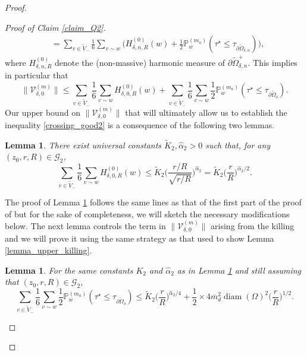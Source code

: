 \documentclass{article}
\newcommand{\PP}{{\mathbb{P}}}
\newtheorem{lemma}[theorem]{Lemma}
\theoremstyle{definition}
\theoremstyle{remark}
\theoremstyle{remark}
\begin{document}
\begin{proof}
\begin{proof}[Proof of Claim \ref{claim_Q2}]
\begin{align*}
    &= \sum_{v \in \tilde V_{-}} \frac{1}{6} \sum_{v \sim w} \bigg( H_{\delta, n, R}^{(0)}(w) +\frac{1}{2}\PP_{w}^{({m}_a)}(\tau^{\star} \leq \tau_{\partial \tilde \Omega_{\delta,n}}) \bigg), 
\end{align*}
where $H_{\delta, n, R}^{(0)}$ denote the (non-massive) harmonic measure of $\partial \tilde \Omega_{\delta, n}^{+}$. This implies in particular that
\begin{equation} \label{ineq_V0}
    \| \mathcal{V}_{\delta,0}^{(m)} \| \leq \sum_{v \in \tilde V_{-}} \frac{1}{6} \sum_{v \sim w} H_{\delta, 0, R}^{(0)}(w) + \sum_{v \in \tilde V_{-}} \frac{1}{6} \sum_{v \sim w} \frac{1}{2}\PP_{w}^{({m}_a)}(\tau^{\star} \leq \tau_{\partial \tilde \Omega_{\delta}}).
\end{equation}
Our upper bound on $\| \mathcal{V}_{\delta, 0}^{(m)} \|$ that will ultimately allow us to establish the inequality \eqref{crossing_good2} is a consequence of the following two lemmas.

\begin{lemma} \label{lemma_upper_H2}
There exist universal constants $\tilde K_2, \hat \alpha_2 >0$ such that, for any $(z_0,r,R) \in \mathcal{G}_2$,
\begin{equation*}
    \sum_{v \in \tilde V_{-}} \frac{1}{6} \sum_{v \sim w} H_{\delta, 0, R}^{(0)}(w) \leq \tilde K_{2} \bigg( \frac{r/R}{\sqrt{r/R}}\bigg)^{\hat \alpha_2} = \tilde K_{2} \bigg( \frac{r}{R} \bigg)^{\hat \alpha_2 /2}.
\end{equation*}
\end{lemma}

The proof of Lemma \ref{lemma_upper_H2} follows the same lines as that of the first part of the proof of \cite[Proposition~6.3]{HE} but for the sake of completeness, we will sketch the necessary modifications below. The next lemma controls the term in $\| \mathcal{V}_{\delta,0}^{(m)}\|$ arising from the killing and we will prove it using the same strategy as that used to show Lemma \ref{lemma_upper_killing}.

\begin{lemma} \label{lemma_upper_killing2}
For the same constants $K_2$ and $\hat \alpha_2$ as in Lemma \ref{lemma_upper_H2} and still assuming that $(z_0,r,R) \in \mathcal{G}_2$,
\begin{equation*}
     \sum_{v \in \tilde V_{-}} \frac{1}{6} \sum_{v \sim w} \frac{1}{2}\PP_{w}^{({m}_a)}(\tau^{\star} \leq \tau_{\partial \tilde \Omega_{\delta}}) \leq \tilde K_2 \bigg( \frac{r}{R}\bigg)^{\hat \alpha_2 /4} + \frac{1}{2} \times 4\overline{m}_d^2\operatorname{diam}(\Omega)^{2} \bigg( \frac{r}{R}\bigg)^{1/2}.
\end{equation*}
\end{lemma}


\end{proof}
\end{proof}
\end{document}
